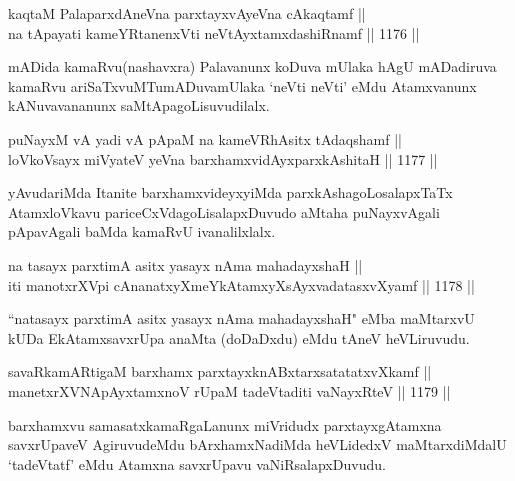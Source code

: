 
\begin{shl}
kaqtaM PalaparxdAneVna parxtayxvAyeVna cAkaqtamf ||  \\
na tApayati kameYRtanenxVti neVtAyxtamxdashiRnamf \hfill || 1176 ||  
\end{shl}

\begin{artha}
mADida kamaRvu(nashavxra) Palavanunx koDuva mUlaka hAgU mADadiruva kamaRvu ariSaTxvuMTumADuvamUlaka `neVti neVti' eMdu Atamxvanunx kANuvavananunx saMtApagoLisuvudilalx.
\end{artha}


\begin{shl}
puNayxM vA yadi vA pApaM na kameVRhAsitx tAdaqshamf ||  \\
loVkoV\s sayx miVyateV yeVna barxhamxvidAyxparxkAshitaH \hfill || 1177 ||  
\end{shl}

\begin{artha}
yAvudariMda Itanite barxhamxvideyxyiMda parxkAshagoLosalapxTaTx AtamxloVkavu pariceCxVdagoLisalapxDuvudo aMtaha puNayxvAgali pApavAgali baMda kamaRvU ivanalilxlalx.
\end{artha}


\begin{shl}
na tasayx parxtimA asitx yasayx nAma mahadayxshaH || \\
iti manotxrXV\s pi cA\s \s nanatxyXmeYkAtamxyXsAyxvadatasxvXyamf \hfill || 1178 ||  
\end{shl}

\begin{artha}
``natasayx parxtimA asitx yasayx nAma mahadayxshaH" eMba maMtarxvU kUDa EkAtamxsavxrUpa anaMta (doDaDxdu) eMdu tAneV heVLiruvudu.
\end{artha}

\begin{shl}
savaRkamARtigaM barxhamx parxtayxknABxtarxsatatatxvXkamf || \\
manetxrXVNApAyxtamxnoV rUpaM tadeVtaditi vaNayxRteV \hfill || 1179 ||  
\end{shl}

\begin{artha}
barxhamxvu samasatxkamaRgaLanunx miVridudx parxtayxgAtamxna savxrUpaveV AgiruvudeMdu bArxhamxNadiMda heVLidedxV maMtarxdiMdalU `tadeVtatf' eMdu Atamxna savxrUpavu vaNiRsalapxDuvudu.
\end{artha}

